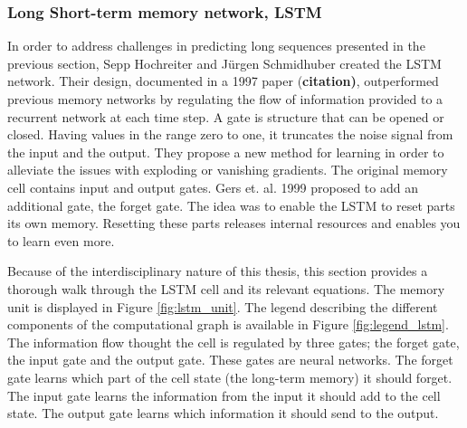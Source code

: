 \documentclass{article}
\begin{document}
\subsubsection{Long Short-term memory network, LSTM} \label{sec:lstm}
In order to address challenges in predicting long sequences presented in the previous section, Sepp Hochreiter and Jürgen Schmidhuber created the LSTM network. Their design, documented in a 1997 paper (\textbf{citation)}, outperformed previous memory networks by regulating the flow of information provided to a recurrent network at each time step.
A gate is structure that can be opened or closed. Having values in the range zero to one, it truncates the noise signal from the input and the output. They propose a new method for learning %
in order to alleviate the issues with exploding or vanishing gradients. The original memory cell contains input and output gates. Gers et. al. 1999 proposed to add an additional gate, the forget gate. The idea was to enable the LSTM to reset parts its own memory. Resetting these parts releases internal resources and enables you to learn even more. 

Because of the interdisciplinary nature of this thesis, this section provides a thorough walk through the LSTM cell and its relevant equations. The memory unit is displayed in Figure \ref{fig:lstm_unit}. The legend describing the different components of the computational graph is available in Figure \ref{fig:legend_lstm}. The information flow thought the cell is regulated by three gates; the forget gate, the input gate and the output gate. These gates are neural networks. The forget gate learns which part of the cell state (the long-term memory) it should forget. The input gate learns the information from the input it should add to the cell state. The output gate learns which information it should send to the output. 
\end{document}

